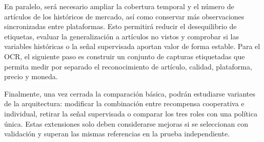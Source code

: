 En paralelo, será necesario ampliar la cobertura temporal y el número de artículos de los históricos de mercado, así como conservar más observaciones sincronizadas entre plataformas. Esto permitirá reducir el desequilibrio de etiquetas, evaluar la generalización a artículos no vistos y comprobar si las variables históricas o la señal supervisada aportan valor de forma estable. Para el OCR, el siguiente paso es construir un conjunto de capturas etiquetadas que permita medir por separado el reconocimiento de artículo, calidad, plataforma, precio y moneda.

Finalmente, una vez cerrada la comparación básica, podrán estudiarse variantes de la arquitectura: modificar la combinación entre recompensa cooperativa e individual, retirar la señal supervisada o comparar los tres roles con una política única. Estas extensiones solo deben considerarse mejoras si se seleccionan con validación y superan las mismas referencias en la prueba independiente.
